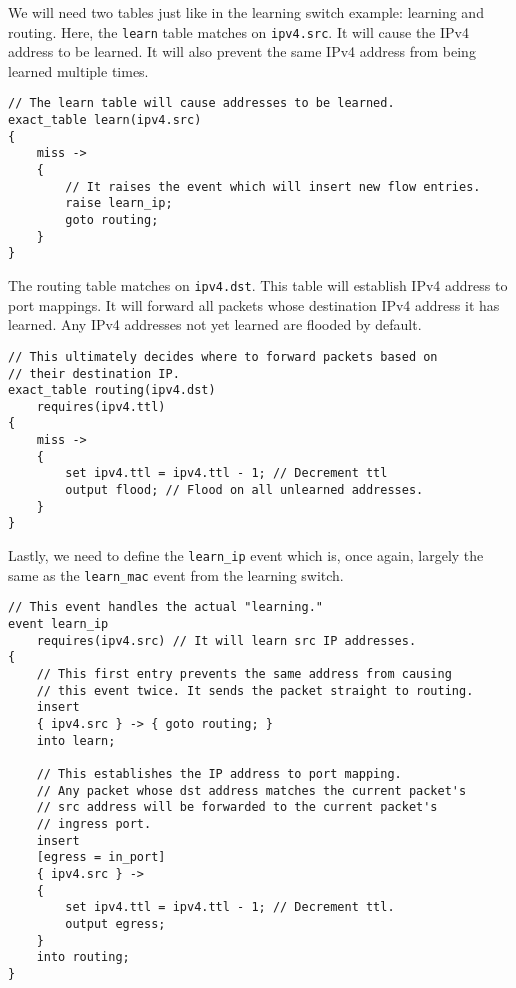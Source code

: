 We will need two tables just like in the learning switch example: learning and routing. Here, the \texttt{learn} table matches on \texttt{ipv4.src}. It will cause the IPv4 address to be learned. It will also prevent the same IPv4 address from being learned multiple times.

\begin{codepage}
\begin{lstlisting}
// The learn table will cause addresses to be learned.
exact_table learn(ipv4.src)
{
	miss ->
	{
		// It raises the event which will insert new flow entries.
		raise learn_ip;  
		goto routing;
	}
}
\end{lstlisting}
\end{codepage}

The routing table matches on \texttt{ipv4.dst}. This table will establish IPv4 address to port mappings. It will forward all packets whose destination IPv4 address it has learned. Any IPv4 addresses not yet learned are flooded by default.

\begin{codepage}
\begin{lstlisting}
// This ultimately decides where to forward packets based on
// their destination IP.
exact_table routing(ipv4.dst)
	requires(ipv4.ttl)
{
	miss -> 
	{ 
		set ipv4.ttl = ipv4.ttl - 1; // Decrement ttl
		output flood; // Flood on all unlearned addresses.
	} 
}
\end{lstlisting}
\end{codepage}

Lastly, we need to define the \texttt{learn\_ip} event which is, once again, largely the same as the \texttt{learn\_mac} event from the learning switch.

\begin{codepage}
\begin{lstlisting}
// This event handles the actual "learning."
event learn_ip
	requires(ipv4.src) // It will learn src IP addresses.
{
	// This first entry prevents the same address from causing
	// this event twice. It sends the packet straight to routing.
	insert
	{ ipv4.src } -> { goto routing; }
	into learn;
	
	// This establishes the IP address to port mapping.
	// Any packet whose dst address matches the current packet's
	// src address will be forwarded to the current packet's
	// ingress port.
	insert
	[egress = in_port]
	{ ipv4.src } -> 
	{ 
		set ipv4.ttl = ipv4.ttl - 1; // Decrement ttl.
		output egress; 
	}
	into routing;
}
\end{lstlisting}
\end{codepage}


